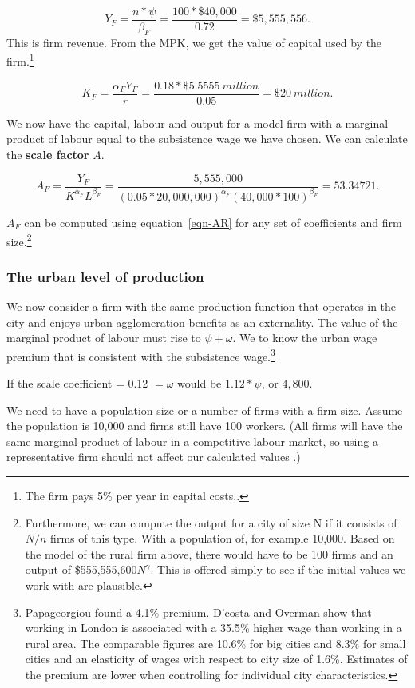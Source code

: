 \documentclass[]{article}
\begin{document}
\[Y_F=\frac{n*\psi}{\beta_F}=\frac{100*\$40,000}{0.72}=\$5,555,556.\]
This is firm revenue. From the MPK, we get the value of capital used by the firm.\footnote{The firm pays 5\% per year in capital costs,.} 

\[K_F=  \frac{\alpha_F Y_F }{r}=\frac{0.18 *\$5.5555\ million}{0.05} =\$20\ million. \]

We now have the capital, labour and output for a model firm with a marginal product of labour  equal to the subsistence wage we have chosen. We can calculate the \textbf{scale factor} $A$.

\begin{equation}  
A_F= \frac{Y_F}{K^{\alpha_F} L^{\beta_F}}=\frac{5,555,000}
{(0.05*20,000,000)^{\alpha_F} (40,000*100)^{\beta_F}} =53.34721. \label{eqn-AR}\end{equation} 

%
$A_F$ can be computed using equation~\ref{eqn-AR} for any set of coefficients and firm size.\footnote{Furthermore, we can compute the output for a city of size N if it consists of $N/n$ firms of this type. With a population of, for example 10,000. Based on the model of the rural firm above,   there would have to be  100 firms and an output of \$555,555,600$N^\gamma$. This is offered simply to see if the initial values we work with are plausible.}


\subsubsection{The urban level of production}
We now consider a firm with the same production function that operates in the city and enjoys  urban agglomeration benefits as an externality. The value of the  marginal product of labour must rise to $\psi+\omega$. We to know  the urban wage premium that is consistent with the subsistence wage.\footnote{Papageorgiou \cite{papageorgiouOccupationalMatchingCities2022} found a 4.1\% premium. D'costa and Overman show that working in London is associated with a 35.5\% higher wage than working in a rural area. The comparable figures are 10.6\% for big cities and 8.3\% for small cities and an elasticity of wages with respect to city size of 1.6\%. Estimates of the premium are lower  when controlling for individual city characteristics.}   

If the scale coefficient = 0.12 $=\omega$ would be $1.12*\psi$, or $4,800$.

We need to have a population size or a number of firms with a firm size. Assume the population is 10,000 and firms still have 100 workers. (All firms will have the same marginal product of labour in a competitive labour market, so using a representative firm should not affect our calculated values .)
\end{document}
